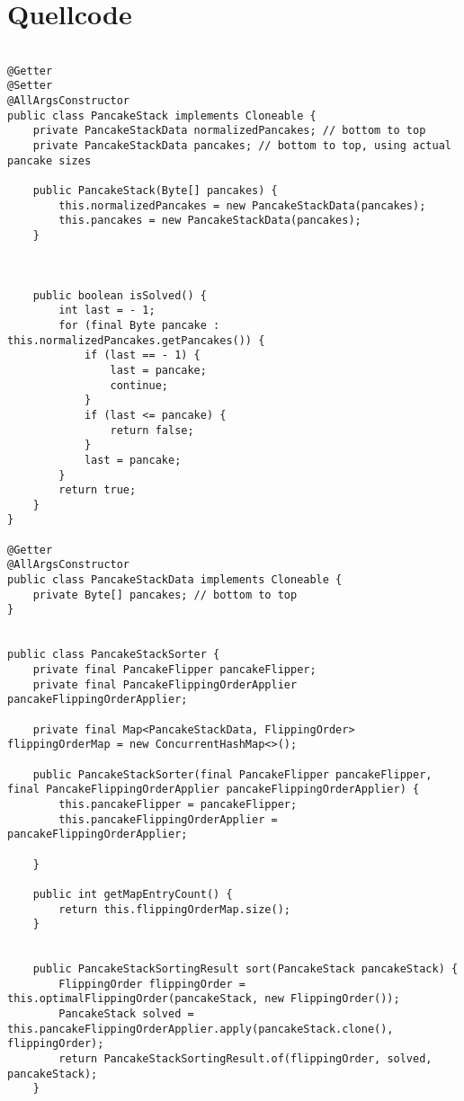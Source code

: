 \section{Quellcode}\label{sec:quellcode}
\begin{lstlisting}[label={lst:source}]

@Getter
@Setter
@AllArgsConstructor
public class PancakeStack implements Cloneable {
    private PancakeStackData normalizedPancakes; // bottom to top
    private PancakeStackData pancakes; // bottom to top, using actual pancake sizes

    public PancakeStack(Byte[] pancakes) {
        this.normalizedPancakes = new PancakeStackData(pancakes);
        this.pancakes = new PancakeStackData(pancakes);
    }



    public boolean isSolved() {
        int last = - 1;
        for (final Byte pancake : this.normalizedPancakes.getPancakes()) {
            if (last == - 1) {
                last = pancake;
                continue;
            }
            if (last <= pancake) {
                return false;
            }
            last = pancake;
        }
        return true;
    }
}

@Getter
@AllArgsConstructor
public class PancakeStackData implements Cloneable {
    private Byte[] pancakes; // bottom to top
}


public class PancakeStackSorter {
    private final PancakeFlipper pancakeFlipper;
    private final PancakeFlippingOrderApplier pancakeFlippingOrderApplier;

    private final Map<PancakeStackData, FlippingOrder> flippingOrderMap = new ConcurrentHashMap<>();

    public PancakeStackSorter(final PancakeFlipper pancakeFlipper, final PancakeFlippingOrderApplier pancakeFlippingOrderApplier) {
        this.pancakeFlipper = pancakeFlipper;
        this.pancakeFlippingOrderApplier = pancakeFlippingOrderApplier;

    }

    public int getMapEntryCount() {
        return this.flippingOrderMap.size();
    }


    public PancakeStackSortingResult sort(PancakeStack pancakeStack) {
        FlippingOrder flippingOrder = this.optimalFlippingOrder(pancakeStack, new FlippingOrder());
        PancakeStack solved = this.pancakeFlippingOrderApplier.apply(pancakeStack.clone(), flippingOrder);
        return PancakeStackSortingResult.of(flippingOrder, solved, pancakeStack);
    }


\end{lstlisting}
